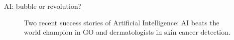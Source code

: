 \documentclass[xcolor=pdftex,dvipsnames,table]{beamer}
\begin{document}
\begin{frame}{AI: bubble or revolution?}
\begin{figure}[htb]
  \caption{Two recent success stories of Artificial Intelligence: AI beats the world champion in GO and dermatologists in skin cancer detection.}
\end{figure}

\end{frame}
\end{document}
